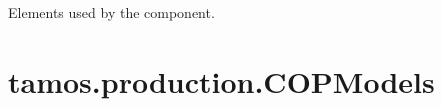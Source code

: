 \documentclass[letterpaper,10pt,english]{sphinxmanual}
\begin{document}
\begin{fulllineitems}
\begin{fulllineitems}
\end{fulllineitems}


\begin{fulllineitems}
\label{\detokenize{generated/tamos.production.CHP:tamos.production.CHP.used_elements}}
\pysigstartsignatures
{}
\pysigstopsignatures
\sphinxAtStartPar
Elements used by the component.

\end{fulllineitems}


\end{fulllineitems}


\sphinxstepscope


\section{tamos.production.COPModels}
\label{\detokenize{generated/tamos.production.COPModels:tamos-production-copmodels}}\label{\detokenize{generated/tamos.production.COPModels::doc}}
\end{document}

